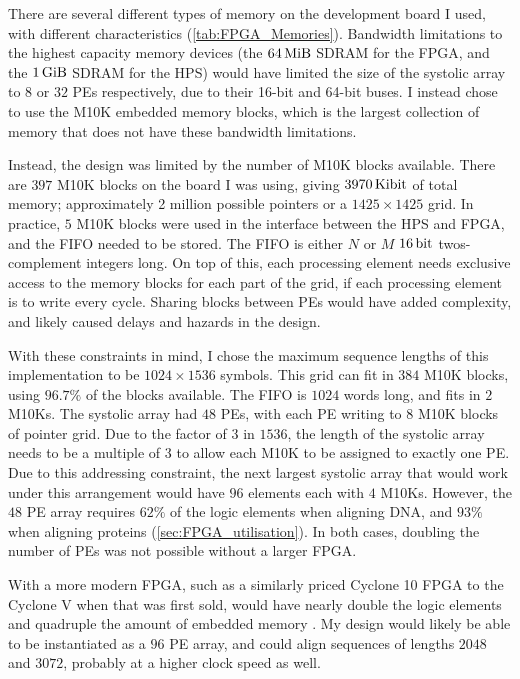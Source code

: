 There are several different types of memory on the development board I used, with different characteristics (\cref{tab:FPGA_Memories}).
Bandwidth limitations to the highest capacity memory devices (the $\SI{64}{\mebi\byte}$ SDRAM for the FPGA, and the $\SI{1}{\gibi\byte}$ SDRAM for the HPS) would have limited the size of the systolic array to $8$ or $32$ PEs respectively, due to their 16-bit and 64-bit buses.
I instead chose to use the M10K embedded memory blocks, which is the largest collection of memory that does not have these bandwidth limitations.

Instead, the design was limited by the number of M10K blocks available.
There are $397$ M10K blocks on the board I was using, giving $\SI{3970}{\kibi\bit}$ of total memory; approximately 2 million possible pointers or a $1425\times1425$ grid.
In practice, $5$ M10K blocks were used in the interface between the HPS and FPGA, and the FIFO needed to be stored.
The FIFO is either $N$ or $M$ $\SI{16}{\bit}$ twos-complement integers long.
On top of this, each processing element needs exclusive access to the memory blocks for each part of the grid, if each processing element is to write every cycle.
Sharing blocks between PEs would have added complexity, and likely caused delays and hazards in the design.

With these constraints in mind, I chose the maximum sequence lengths of this implementation to be $1024\times1536$ symbols.
This grid can fit in $384$ M10K blocks, using $96.7\%$ of the blocks available.
The FIFO is $1024$ words long, and fits in $2$ M10Ks.
The systolic array had $48$ PEs, with each PE writing to $8$ M10K blocks of pointer grid.
Due to the factor of $3$ in $1536$, the length of the systolic array needs to be a multiple of $3$ to allow each M10K to be assigned to exactly one PE.
Due to this addressing constraint, the next largest systolic array that would work under this arrangement would have $96$ elements each with $4$ M10Ks.
However, the $48$ PE array requires $62\%$ of the logic elements when aligning DNA, and $93\%$ when aligning proteins (\cref{sec:FPGA_utilisation}).
In both cases, doubling the number of PEs was not possible without a larger FPGA.

With a more modern FPGA, such as a similarly priced Cyclone 10 FPGA to the Cyclone V when that was first sold, would have nearly double the logic elements and quadruple the amount of embedded memory \cite{Cyclone10}.
My design would likely be able to be instantiated as a $96$ PE array, and could align sequences of lengths $2048$ and $3072$, probably at a higher clock speed as well.

